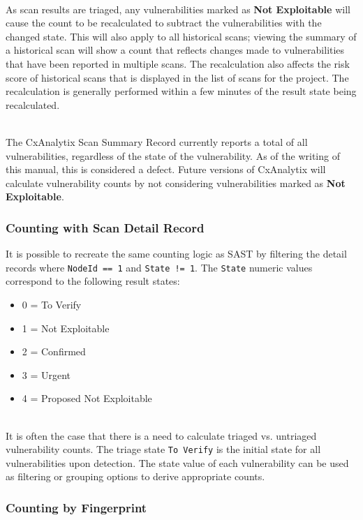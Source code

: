\noindent\\As scan results are triaged, any vulnerabilities marked as \textbf{Not Exploitable} will cause the count to be recalculated
to subtract the vulnerabilities with the changed state.  This will also apply to all historical scans; viewing the summary of a historical scan
will show a count that reflects changes made to vulnerabilities that have been reported in multiple scans.  The recalculation also affects the risk score of
historical scans that is displayed in the list of scans for the project.  The recalculation is generally performed within a few minutes of the result state being recalculated.

\noindent\\The CxAnalytix Scan Summary Record currently reports a total of all vulnerabilities, regardless of the state of the vulnerability.  As of the writing of this manual,
this is considered a defect.  Future versions of CxAnalytix will calculate vulnerability counts by not considering vulnerabilities marked as \textbf{Not Exploitable}.


\subsubsection{Counting with Scan Detail Record}

It is possible to recreate the same counting logic as SAST by filtering the detail records where \texttt{NodeId == 1} and \texttt{State != 1}.  The \texttt{State}
numeric values correspond to the following result states:


\begin{itemize}
    \item 0 = To Verify
    \item 1 = Not Exploitable
    \item 2 = Confirmed
    \item 3 = Urgent
    \item 4 = Proposed Not Exploitable
\end{itemize}

\noindent\\It is often the case that there is a need to calculate triaged vs. untriaged vulnerability counts.  The triage state \texttt{To Verify} is the
initial state for all vulnerabilities upon detection.  The state value of each vulnerability can be used as filtering or grouping options to derive appropriate counts.


\subsubsection{Counting by Fingerprint}

